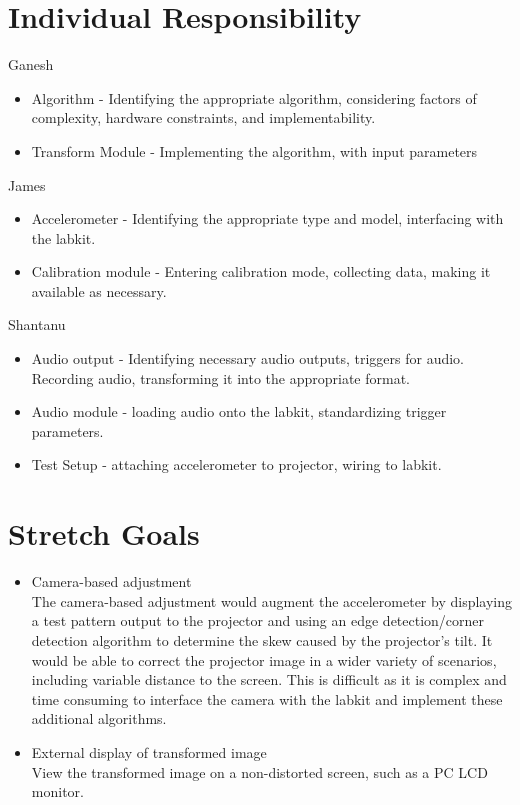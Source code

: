 \documentclass{article}
\begin{document}
\section{Individual Responsibility}
\begin{description}
	\item{Ganesh}
	\begin{itemize}
		\item Algorithm - Identifying the appropriate algorithm, considering factors of complexity, hardware constraints, and implementability.
		\item Transform Module - Implementing the algorithm, with input parameters
	\end{itemize}
	\item{James}
	\begin{itemize}
		\item Accelerometer - Identifying the appropriate type and model, interfacing with the labkit.
		\item Calibration module - Entering calibration mode, collecting data, making it available as necessary.
	\end{itemize}
	\item{Shantanu}
	\begin{itemize}
		\item Audio output - Identifying necessary audio outputs, triggers for audio. Recording audio, transforming it into the appropriate format.
		\item Audio module - loading audio onto the labkit, standardizing trigger parameters.
		\item Test Setup - attaching accelerometer to projector, wiring to labkit.
	\end{itemize}
\end{description}

\section{Stretch Goals}
	\begin{itemize}
		\item Camera-based adjustment \hfill \\
			The camera-based adjustment would augment the accelerometer by displaying a test pattern output to the projector and using an edge detection/corner detection algorithm to determine the skew caused by the projector's tilt. It would be able to correct the projector image in a wider variety of scenarios, including variable distance to the screen. This is difficult as it is complex and time consuming to interface the camera with the labkit and implement these additional algorithms.
		\item External display of transformed image\hfill \\
			View the transformed image on a non-distorted screen, such as a PC LCD monitor.
	\end{itemize}
\end{document}
